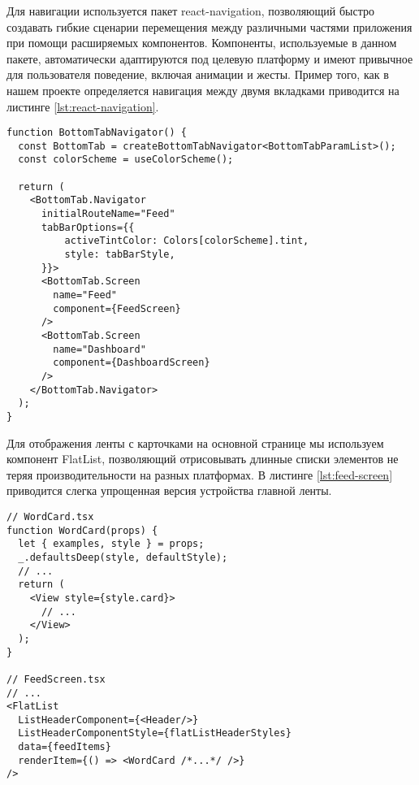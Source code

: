 Для навигации используется пакет react-navigation, позволяющий быстро создавать гибкие сценарии перемещения между различными частями приложения при помощи расширяемых компонентов. Компоненты, используемые в данном пакете, автоматически адаптируются под целевую платформу и имеют привычное для пользователя поведение, включая анимации и жесты. Пример того, как в нашем проекте определяется навигация между двумя вкладками приводится на листинге \ref{lst:react-navigation}.
\begin{lstlisting}[basicstyle=\fontsize{11}{11}\selectfont,tabsize=4,breaklines=true,caption={Навигация с использованием вкладок.},captionpos=b,label={lst:react-navigation}]
function BottomTabNavigator() {
  const BottomTab = createBottomTabNavigator<BottomTabParamList>();
  const colorScheme = useColorScheme();

  return (
    <BottomTab.Navigator
      initialRouteName="Feed"
      tabBarOptions={{
          activeTintColor: Colors[colorScheme].tint,
          style: tabBarStyle,
      }}>
      <BottomTab.Screen
        name="Feed"
        component={FeedScreen}
      />
      <BottomTab.Screen
        name="Dashboard"
        component={DashboardScreen}
      />
    </BottomTab.Navigator>
  );
}
\end{lstlisting}

Для отображения ленты с карточками на основной странице мы используем компонент FlatList, позволяющий отрисовывать длинные списки элементов не теряя производительности на разных платформах. В листинге \ref{lst:feed-screen} приводится слегка упрощенная версия устройства главной ленты.
\begin{lstlisting}[basicstyle=\fontsize{11}{11}\selectfont,tabsize=4,breaklines=true,caption={Структура главной ленты с карточками.},captionpos=b,label={lst:feed-screen}]
// WordCard.tsx
function WordCard(props) {
  let { examples, style } = props;
  _.defaultsDeep(style, defaultStyle);
  // ...
  return (
    <View style={style.card}>
      // ...
    </View>
  );
}

// FeedScreen.tsx
// ...
<FlatList
  ListHeaderComponent={<Header/>}
  ListHeaderComponentStyle={flatListHeaderStyles}
  data={feedItems}
  renderItem={() => <WordCard /*...*/ />}
/>
\end{lstlisting}


